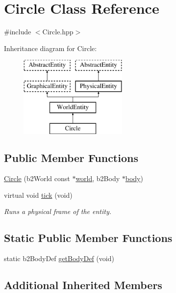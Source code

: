 \hypertarget{class_circle}{}\section{Circle Class Reference}
\label{class_circle}


{\ttfamily \#include $<$Circle.\+hpp$>$}

Inheritance diagram for Circle\+:\begin{figure}[H]
\begin{center}
\leavevmode
\includegraphics[height=4.000000cm]{class_circle}
\end{center}
\end{figure}
\subsection*{Public Member Functions}
\begin{DoxyCompactItemize}
\item 
\hyperlink{class_circle_a7e86a4697d23fba03002e859070536c5}{Circle} (b2\+World const $\ast$\hyperlink{class_physical_entity_ae6c23c3817c4d7f9a867abed05cd7834}{world}, b2\+Body $\ast$\hyperlink{class_physical_entity_a91a5016393dd890c490b329abd938ec7}{body})
\item 
virtual void \hyperlink{class_circle_a352287304dc72826b75108e7333dc6d1}{tick} (void)
\begin{DoxyCompactList}\small\item\em Runs a physical frame of the entity. \end{DoxyCompactList}\end{DoxyCompactItemize}
\subsection*{Static Public Member Functions}
\begin{DoxyCompactItemize}
\item 
static b2\+Body\+Def \hyperlink{class_circle_aa3f08fbafb89c33743b16136c30a3e50}{get\+Body\+Def} (void)
\end{DoxyCompactItemize}
\subsection*{Additional Inherited Members}


